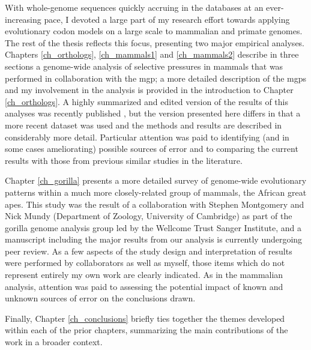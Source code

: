 With whole-genome sequences quickly accruing in the databases at an
ever-increasing pace, I devoted a large part of my research effort
towards applying evolutionary codon models on a large scale to
mammalian and primate genomes. The rest of the thesis reflects this
focus, presenting two major empirical analyses. Chapters
\ref{ch_orthologs}, \ref{ch_mammals1} and \ref{ch_mammals2} describe
in three sections a genome-wide analysis of \sw selective pressures in
mammals that was performed in collaboration with the \acf{mgp}; a more
detailed description of the \acp{mgp} and my involvement in the
analysis is provided in the introduction to Chapter
\ref{ch_orthologs}. A highly summarized and edited version of the
results of this analyses was recently published
\citep{LindbladToh2011}, but the version presented here differs in
that a more recent dataset was used and the methods and results are
described in considerably more detail. Particular attention was paid
to identifying (and in some cases ameliorating) possible sources of
error and to comparing the current results with those from previous
similar studies in the literature.

Chapter \ref{ch_gorilla} presents a more detailed survey of
genome-wide evolutionary patterns within a much more closely-related
group of mammals, the African great apes. This study was the result of
a collaboration with Stephen Montgomery and Nick Mundy (Department of
Zoology, University of Cambridge) as part of the gorilla genome
analysis group led by the Wellcome Trust Sanger Institute, and a
manuscript including the major results from our analysis is currently
undergoing peer review. As a few aspects of the study design and
interpretation of results were performed by collaborators as well as
myself, those items which do not represent entirely my own work are
clearly indicated. As in the mammalian analysis, attention was paid to
assessing the potential impact of known and unknown sources of error
on the conclusions drawn.

Finally, Chapter \ref{ch_conclusions} briefly ties together the themes
developed within each of the prior chapters, summarizing the main
contributions of the work in a broader context.
